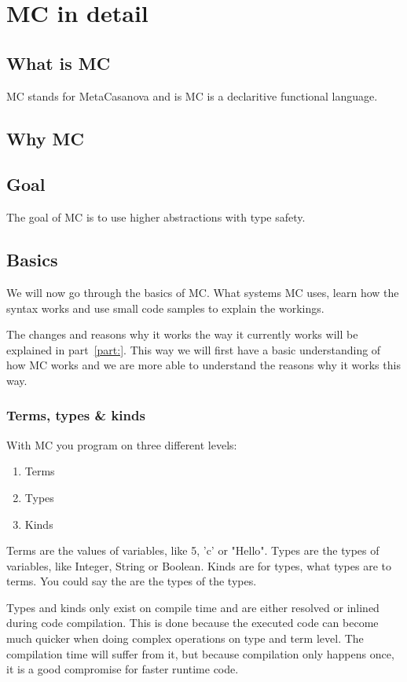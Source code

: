 \chapter{MC in detail}

\section{What is MC}
MC stands for MetaCasanova and is MC is a declaritive functional language.
\section{Why MC}


\section{Goal}
The goal of MC is to use higher abstractions with type safety.

\section{Basics}
We will now go through the basics of MC.
What systems MC uses, learn how the syntax works and use small code samples to explain the workings.

The changes and reasons why it works the way it currently works will be explained in part~\ref{part:}.
This way we will first have a basic understanding of how MC works and we are more able to understand the reasons why it works this way.


\subsection{Terms, types \& kinds}
With MC you program on three different levels:
\begin{enumerate}
   \item Terms
   \item Types
   \item Kinds
\end{enumerate}
Terms are the values of variables, like 5, 'c' or "Hello".
Types are the types of variables, like Integer, String or Boolean.
Kinds are for types, what types are to terms.
You could say the are the types of the types.

Types and kinds only exist on compile time and are either resolved or inlined during code compilation.
This is done because the executed code can become much quicker when doing complex operations on type and term level.
The compilation time will suffer from it, but because compilation only happens once, it is a good compromise for faster runtime code.

